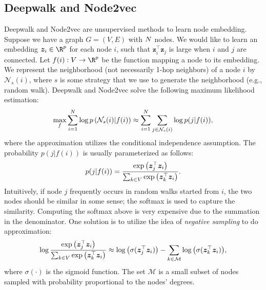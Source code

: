    
\subsection{Deepwalk and Node2vec}
    Deepwalk and Node2vec are unsupervised methods to learn node embedding.
    Suppose we have a graph $G=(V, E)$ with $N$ nodes.
    We would like to learn an embedding $\bm{z}_i \in \R^\nfeat$ for each node $i$, such that $\bm{z}^{\top}_i \bm{z}_j$ is large when $i$ and $j$ are connected.
    Let $f(i): V \rightarrow \R^\nfeat$ be the function mapping a node to its embedding.
    We represent the neighborhood (not necessarily 1-hop neighbors) of a node $i$ by $\mathcal{N}_{s}(i)$, where $s$ is some strategy that we use to generate the neighborhood (e.g., random walk).
    Deepwalk and Node2vec solve the following maximum likelihood estimation:
        \begin{equation}
            \max_{f} \sum_{i=1}^{N}{ \log p\left(\mathcal{N}_s(i) | f(i) \right)} \approx \sum_{i=1}^{N}{ \sum_{j \in \mathcal{N}_s(i)}^{}{\log p(j | f(i))} },
        \end{equation}
    where the approximation utilizes the conditional independence assumption.
    The probability $p(j | f(i))$ is usually parameterized as follows:
        \begin{equation}
            p(j | f(i)) = \frac{ \text{exp}\left( \bm{z}_j^\top \bm{z}_i \right) }{\sum_{k\in V}^{}{ \text{exp}\left( \bm{z}_k^\top \bm{z}_i \right) }}.
        \end{equation}
    Intuitively, if node $j$ frequently occurs in random walks started from $i$, the two nodes should be similar in some sense; the softmax is used to capture the similarity.
    Computing the softmax above is very expensive due to the summation in the denominator.
    One solution is to utilize the idea of \emph{negative sampling} to do approximation:
        \begin{equation}
            \log \frac{ \text{exp}\left( \bm{z}_j^\top \bm{z}_i \right) }{\sum_{k\in V}^{}{ \text{exp}\left( \bm{z}_k^\top \bm{z}_i \right) }} \approx \log\left( \sigma(\bm{z}_j^\top \bm{z}_i) \right)  - \sum_{k\in \mathcal{M}}^{}{\log\left( \sigma(\bm{z}_k^\top \bm{z}_i) \right)},
        \end{equation}
    where $\sigma(\cdot)$ is the sigmoid function.
    The set $\mathcal{M}$ is a small subset of nodes sampled with probability proportional to the nodes' degrees. 
    
    
